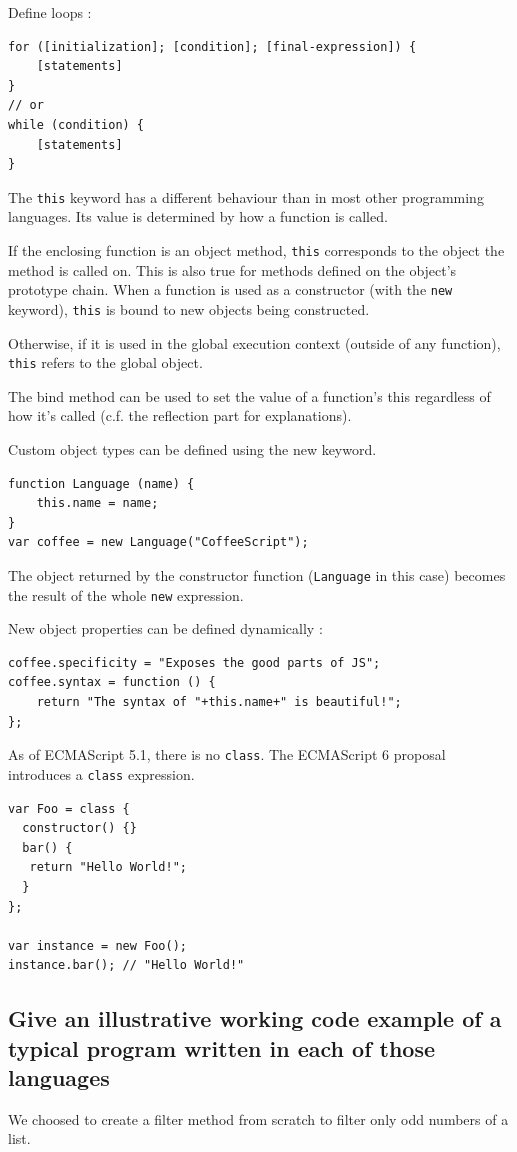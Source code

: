 \documentclass[a4paper,10pt]{article}
\begin{document}
Define loops :

\begin{lstlisting}
for ([initialization]; [condition]; [final-expression]) {
    [statements]
}
// or
while (condition) {
    [statements]
}
\end{lstlisting}


The \lstinline|this| keyword has a different behaviour than in most other programming languages. 
Its value is determined by how a function is called.

If the enclosing function is an object method, \lstinline|this| corresponds to the object the method is called on. This is also true for methods defined on the object’s prototype chain. When a function is used as a constructor (with the \lstinline|new| keyword), \lstinline|this| is bound to new objects being constructed.

Otherwise, if it is used in the global execution context (outside of any function), \lstinline|this| refers to the global object.

The bind method can be used to set the value of a function's this regardless of how it's called (c.f. the reflection part for explanations).

Custom object types can be defined using the new keyword.
\begin{lstlisting}
function Language (name) {
    this.name = name;
}
var coffee = new Language("CoffeeScript");
\end{lstlisting}
The object returned by the constructor function (\lstinline|Language| in this case) becomes the result of the whole \lstinline|new| expression.

New object properties can be defined dynamically :
\begin{lstlisting}
coffee.specificity = "Exposes the good parts of JS";
coffee.syntax = function () {
    return "The syntax of "+this.name+" is beautiful!";
};
\end{lstlisting}

As of ECMAScript 5.1, there is no \lstinline|class|.
The ECMAScript 6 proposal introduces a \lstinline|class| expression.

\begin{lstlisting}
var Foo = class {
  constructor() {}
  bar() {
   return "Hello World!";
  }
};

var instance = new Foo();
instance.bar(); // "Hello World!"
\end{lstlisting}


\subsection{Give an illustrative working code example of a typical program written in each of those languages}
We choosed to create a filter method from scratch to filter only odd numbers of a list.
\end{document}
